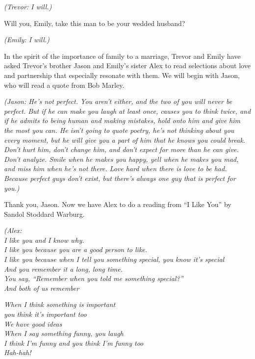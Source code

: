 \documentclass[12pt]{article}
\begin{document}
\textsl{(Trevor: I will.)} \par

Will you, Emily, take this man to be your wedded husband? \par

\textsl{(Emily: I will.)} \par

In the spirit of the importance of family to a marriage, Trevor and
Emily have asked Trevor's brother Jason and Emily's sister Alex to
read selections about love and partnership that especially resonate
with them. We will begin with Jason, who will read a quote from Bob
Marley. \par

\textit{(Jason: He's not perfect. You aren't either, and the two of
  you will never be perfect. But if he can make you laugh at least
  once, causes you to think twice, and if he admits to being human and
  making mistakes, hold onto him and give him the most you can. He
  isn't going to quote poetry, he's not thinking about you every
  moment, but he will give you a part of him that he knows you could
  break. Don't hurt him, don't change him, and don't expect for more
  than he can give. Don't analyze. Smile when he makes you happy, yell
  when he makes you mad, and miss him when he's not there. Love hard
  when there is love to be had. Because perfect guys don't exist, but
  there's always one guy that is perfect for you.)} \par

Thank you, Jason. Now we have Alex to do a reading from ``I Like You''
by Sandol Stoddard Warburg. \par

\textsl{(Alex: \\
  I like you and I know why. \\
  I like you because you are a good person to like. \\
  I like you because when I tell you something special,
  you know it's special \\
  And you remember it a long, long time. \\
  You say, "`Remember when you told me something special?"' \\
  And both of us remember} \par

\textsl{When I think something is important \\
  you think it's important too \\
  We have good ideas \\
  When I say something funny, you laugh \\
  I think I'm funny and you think I'm funny too \\
  Hah-hah!} \par
\end{document}
